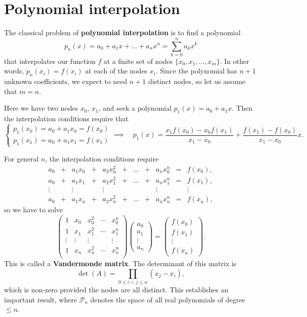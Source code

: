\documentclass[
  letterpaper,
  DIV=11,
  numbers=noendperiod]{scrreprt}
\begin{document}
\section{Polynomial interpolation}\label{polynomial-interpolation}

The classical problem of \textbf{polynomial interpolation} is to find a
polynomial \[
p_n(x) = a_0 + a_1x + \ldots + a_n x^n = \sum_{k=0}^n a_k x^k
\] that interpolates our function \(f\) at a finite set of nodes
\(\{x_0, x_1, \ldots, x_m\}\). In other words, \(p_n(x_i)=f(x_i)\) at
each of the nodes \(x_i\). Since the polynomial has \(n+1\) unknown
coefficients, we expect to need \(n+1\) distinct nodes, so let us assume
that \(m=n\).

Here we have two nodes \(x_0\), \(x_1\), and seek a polynomial
\(p_1(x) = a_0 + a_1x\). Then the interpolation conditions require that
\[
\begin{cases}
p_1(x_0) = a_0 + a_1x_0 = f(x_0)\\
p_1(x_1) = a_0 + a_1x_1 = f(x_1)
\end{cases}
\implies\quad
p_1(x) = \frac{x_1f(x_0) - x_0f(x_1)}{x_1 - x_0} + \frac{f(x_1) - f(x_0)}{x_1 - x_0}x.
\]

For general \(n\), the interpolation conditions require \[
\begin{matrix}
a_0 &+& a_1x_0 &+& a_2x_0^2 &+& \ldots &+& a_nx_0^n &=& f(x_0),\\
a_0 &+& a_1x_1 &+& a_2x_1^2 &+& \ldots &+& a_nx_1^n &=& f(x_1),\\
\vdots  && \vdots  && \vdots     &&        &&\vdots      && \vdots\\
a_0 &+& a_1x_n &+& a_2x_n^2 &+& \ldots &+& a_nx_n^n &=& f(x_n),
\end{matrix}
\] so we have to solve \[
\begin{pmatrix}
1 & x_0 & x_0^2 & \cdots & x_0^n\\
1 & x_1 & x_1^2 & \cdots & x_1^n\\
\vdots & \vdots &\vdots& & \vdots\\
1 & x_n & x_n^2 & \cdots & x_n^n\\
\end{pmatrix}
\begin{pmatrix}
a_0\\ a_1\\ \vdots\\ a_n
\end{pmatrix}
=
\begin{pmatrix}
f(x_0)\\ f(x_1)\\ \vdots\\ f(x_n)
\end{pmatrix}.
\] This is called a \textbf{Vandermonde matrix}. The determinant of this
matrix is \[
\det(A) = \prod_{0\leq i < j\leq n} (x_j - x_i),
\] which is non-zero provided the nodes are all distinct. This
establishes an important result, where \(\mathcal{P}_n\) denotes the
space of all real polynomials of degree \(\leq n\).
\end{document}

